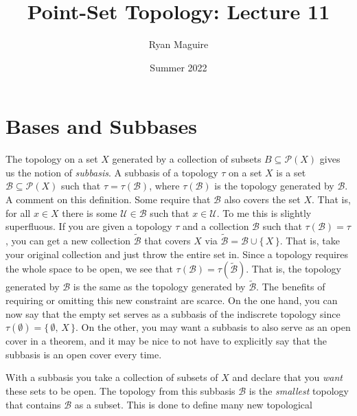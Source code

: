 \documentclass{article}
\title{Point-Set Topology: Lecture 11}
\author{Ryan Maguire}
\date{Summer 2022}
\theoremstyle{plain}
\theoremstyle{normal}
\newenvironment{definition}{%
    \pushQED{\qed}\renewcommand{\qedsymbol}{$\blacksquare$}\definitionx%
}{%
    \popQED\enddefinitionx%
}
\begin{document}
    \maketitle
    \section{Bases and Subbases}
        The topology on a set $X$ generated by a collection of subsets
        $B\subseteq\mathcal{P}(X)$ gives us the notion of \textit{subbasis}.
        \begin{definition}[\textbf{Subbasis of a Topology}]
            A subbasis of a topology $\tau$ on a set $X$ is a set
            $\mathcal{B}\subseteq\mathcal{P}(X)$ such that
            $\tau=\tau(\mathcal{B})$, where $\tau(\mathcal{B})$
            is the topology generated by $\mathcal{B}$.
        \end{definition}
        A comment on this definition. Some require that $\mathcal{B}$ also
        covers the set $X$. That is, for all $x\in{X}$ there is some
        $\mathcal{U}\in\mathcal{B}$ such that $x\in\mathcal{U}$. To me this is
        slightly superfluous. If you are given a topology $\tau$ and a
        collection $\mathcal{B}$ such that $\tau(\mathcal{B})=\tau$, you can
        get a new collection $\tilde{\mathcal{B}}$ that covers $X$ via
        $\tilde{\mathcal{B}}=\mathcal{B}\cup\{\,X\,\}$. That is, take your
        original collection and just throw the entire set in. Since a topology
        requires the whole space to be open, we see that
        $\tau(\mathcal{B})=\tau(\tilde{\mathcal{B}})$. That is, the topology
        generated by $\mathcal{B}$ is the same as the topology generated by
        $\tilde{\mathcal{B}}$. The benefits of requiring or omitting this
        new constraint are scarce. On the one hand, you can now say that the
        empty set serves as a subbasis of the indiscrete topology since
        $\tau(\emptyset)=\{\,\emptyset,\,X\,\}$. On the other, you may want
        a subbasis to also serve as an open cover in a theorem, and it may be
        nice to not have to explicitly say that the subbasis is an open cover
        every time.
        \par\hfill\par
        With a subbasis you take a collection of subsets of $X$ and declare that
        you \textit{want} these sets to be open. The topology from this subbasis
        $\mathcal{B}$ is the \textit{smallest} topology that contains
        $\mathcal{B}$ as a subset. This is done to define many new topological
\end{document}

